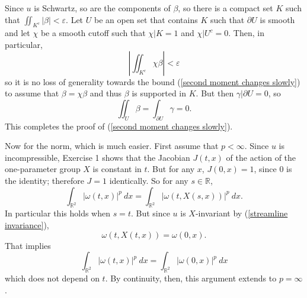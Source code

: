 \documentclass[10pt]{article}
\newcommand{\RR}{\mathbb{R}}
\theoremstyle{definition}
\begin{document}
Since $u$ is Schwartz, so are the components of $\beta$, so there is a compact set $K$ such that $\iint_{K^c} |\beta| < \varepsilon$.
Let $U$ be an open set that contains $K$ such that $\partial U$ is smooth and let $\chi$ be a smooth cutoff such that $\chi|K = 1$ and $\chi|U^c = 0$.
Then, in particular,
$$\left|\iint_{K^c} \chi\beta\right| < \varepsilon$$
so it is no loss of generality towards the bound (\ref{second moment changes slowly}) to assume that $\beta = \chi\beta$ and thus $\beta$ is supported in $K$. But then $\gamma|\partial U = 0$, so
$$\iint_U \beta = \int_{\partial U} \gamma = 0.$$
This completes the proof of (\ref{second moment changes slowly}).

Now for the norm, which is much easier.
First assume that $p < \infty$.
Since $u$ is incompressible, Exercise 1 shows that the Jacobian $J(t, x)$ of the action of the one-parameter group $X$ is constant in $t$.
But for any $x$, $J(0, x) = 1$, since $0$ is the identity; therefore $J = 1$ identically.
So for any $s \in \RR$,
$$\int_{\RR^2} |\omega(t, x)|^p ~dx = \int_{\RR^2} |\omega(t, X(s, x))|^p ~dx.$$
In particular this holds when $s = t$. But since $u$ is $X$-invariant by (\ref{streamline invariance}),
$$\omega(t, X(t, x)) = \omega(0, x).$$
That implies
$$\int_{\RR^2} |\omega(t, x)|^p ~dx = \int_{\RR^2} |\omega(0, x)|^p ~dx$$
which does not depend on $t$.
By continuity, then, this argument extends to $p = \infty$.
\end{document}
